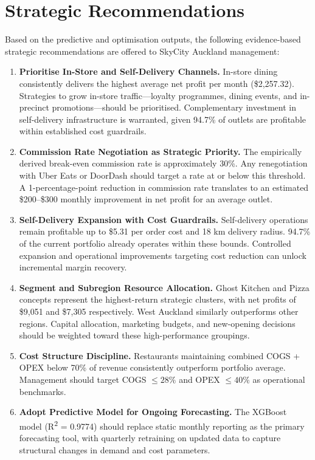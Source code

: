 \documentclass[10pt,a4paper,twocolumn]{article}
\begin{document}
\section{Strategic Recommendations}
\label{sec:recommendations}

Based on the predictive and optimisation outputs, the following evidence-based
strategic recommendations are offered to SkyCity Auckland management:

\begin{enumerate}[leftmargin=*, label=\textbf{R\arabic*.}, itemsep=2pt]

  \item \textbf{Prioritise In-Store and Self-Delivery Channels.}
  In-store dining consistently delivers the highest average net profit per month
  (\$2{,}257.32). Strategies to grow in-store traffic—loyalty programmes, dining
  events, and in-precinct promotions—should be prioritised. Complementary investment
  in self-delivery infrastructure is warranted, given 94.7\% of outlets are profitable
  within established cost guardrails.

  \item \textbf{Commission Rate Negotiation as Strategic Priority.}
  The empirically derived break-even commission rate is approximately 30\%. Any
  renegotiation with Uber Eats or DoorDash should target a rate at or below this
  threshold. A 1-percentage-point reduction in commission rate translates to an
  estimated \$200--\$300 monthly improvement in net profit for an average outlet.

  \item \textbf{Self-Delivery Expansion with Cost Guardrails.}
  Self-delivery operations remain profitable up to \$5.31 per order cost and 18 km
  delivery radius. 94.7\% of the current portfolio already operates within these bounds.
  Controlled expansion and operational improvements targeting cost reduction can unlock
  incremental margin recovery.

  \item \textbf{Segment and Subregion Resource Allocation.}
  Ghost Kitchen and Pizza concepts represent the highest-return strategic clusters, with
  net profits of \$9{,}051 and \$7{,}305 respectively. West Auckland similarly outperforms
  other regions. Capital allocation, marketing budgets, and new-opening decisions should be
  weighted toward these high-performance groupings.

  \item \textbf{Cost Structure Discipline.}
  Restaurants maintaining combined COGS + OPEX below 70\% of revenue consistently
  outperform portfolio average. Management should target COGS $\leq 28\%$ and OPEX
  $\leq 40\%$ as operational benchmarks.

  \item \textbf{Adopt Predictive Model for Ongoing Forecasting.}
  The XGBoost model (R\textsuperscript{2} = 0.9774) should replace static monthly reporting
  as the primary forecasting tool, with quarterly retraining on updated data to capture
  structural changes in demand and cost parameters.

\end{enumerate}
\end{document}
